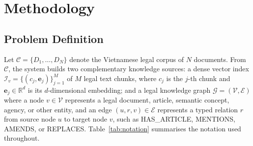 \section{Methodology}\label{sec:methodology}

\subsection{Problem Definition}\label{subsec:problem_definition}

Let $\mathcal{C}=\{D_1,\ldots,D_N\}$ denote the Vietnamese legal corpus of
$N$ documents. From $\mathcal{C}$, the system builds two complementary
knowledge sources: a dense vector index
$\mathcal{I}_v=\{(c_j,\mathbf{e}_j)\}_{j=1}^{M}$ of $M$ legal text chunks,
where $c_j$ is the $j$-th chunk and $\mathbf{e}_j\in\mathbb{R}^d$ is its
$d$-dimensional embedding; and a legal knowledge graph
$\mathcal{G}=(\mathcal{V},\mathcal{E})$ where a node $v\in\mathcal{V}$
represents a legal document, article, semantic concept, agency, or other
entity, and an edge $(u,r,v)\in\mathcal{E}$ represents a typed relation $r$
from source node $u$ to target node $v$, such as \textsc{HAS\_ARTICLE},
\textsc{MENTIONS}, \textsc{AMENDS}, or \textsc{REPLACES}. Table~\ref{tab:notation}
summarises the notation used throughout.

